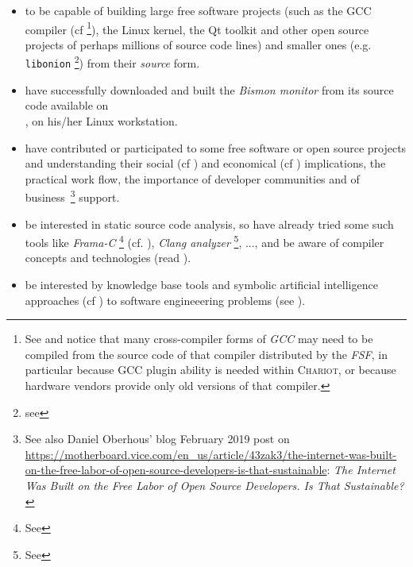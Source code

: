 \begin{itemize}
\item to be capable of building large free software projects (such as
  the GCC compiler (cf \cite{gcc-internals} \footnote{See
     and notice that many cross-compiler
    forms of \emph{GCC} may need to be compiled from the source code
    of that compiler distributed by the \emph{FSF}, in particular
    because GCC plugin ability is needed within \textsc{Chariot}, or
    because hardware vendors provide only old versions of that
    compiler.}), the Linux kernel, the Qt toolkit and other open
  source projects of perhaps millions of source code lines) and
  smaller ones (e.g. \texttt{libonion} \footnote{see
    }) from their \emph{source}
  form.

\item have successfully downloaded and built the \emph{Bismon monitor}
   from its source code  available on
  \\ , on his/her Linux
  workstation.
  
\item have contributed or participated to some free software or open
  source projects and understanding their social (cf
  \cite{Raymond:2001:CathBaz}) and economical (cf
  \cite{Weber:2004:SuccessOpenSource, Tirole:2016:EcoBienCommun,
    Nagle:2018:Contributing, DiCosmo:1998:Holdup,
    Lerner-Tirole:2000:economics-open-source}) implications, the
  practical work flow, the importance of developer communities and of
  business~\footnote{See also Daniel Oberhous' blog February 2019 post
    on
    \url{https://motherboard.vice.com/en_us/article/43zak3/the-internet-was-built-on-the-free-labor-of-open-source-developers-is-that-sustainable}:
    \emph{The Internet Was Built on the Free Labor of Open Source
      Developers. Is That Sustainable?}} support.
  
\item be interested in static source code analysis, so have already
  tried some such tools like \emph{Frama-C} \footnote{See
    } (cf. \cite{Cuoq:2012:Frama-C}),
  \emph{Clang analyzer} \footnote{See
    }, ..., and be aware of
   compiler concepts and technologies (read
  \cite{Aho:2006:DragonBook}).

  \item be interested by knowledge base tools and symbolic artificial
    intelligence approaches (cf \cite{nouira:1996:knowledge,
      Pitrat:1990:Metaconnaissances, Pitrat:1996:FGCS,
      Polito:2014:Bootstrapping-pharo, RAJ-2018-NoSQL,
      Rodriguez:2019:AgileLean, doyle:1985:expert,
      Starynkevitch-1990-EUM}) to software engineeering problems (see
    \cite{rich2014readings, beckert2007verification,
      happel2006applications, rus2002knowledge, Baudin2002CaveatAT,
      TWO:2001:WAPATV, Starynkevitch2007Multistage}).


\end{itemize}

